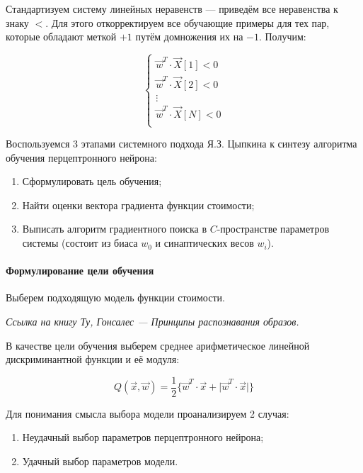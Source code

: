 \documentclass{article}
\numberwithin{equation}{subsection}
\begin{document}
Стандартизуем систему линейных неравенств --- приведём все неравенства к знаку $<$. 
Для этого откорректируем все обучающие примеры для тех пар, которые обладают меткой
$+1$ путём домножения их на $-1$. Получим:

\begin{equation}
    \begin{cases}
        \vec{w}^T \cdot \vec{X}[1] < 0 \\
        \vec{w}^T \cdot \vec{X}[2] < 0 \\
        \vdots \\
        \vec{w}^T \cdot \vec{X}[N] < 0 \\
    \end{cases}
    \label{eq:ineq_system}
\end{equation}

Воспользуемся 3 этапами системного подхода Я.З. Цыпкина к синтезу алгоритма обучения
перцептронного нейрона:
\begin{enumerate}
    \item Сформулировать цель обучения;
    \item Найти оценки вектора градиента функции стоимости;
    \item Выписать алгоритм градиентного поиска в $C$-пространстве параметров системы
    (состоит из биаса $w_0$ и синаптических весов $w_i$).
\end{enumerate}




\paragraph{Формулирование цели обучения}

Выберем подходящую модель функции стоимости.

\begin{myquote}
    \textit{Ссылка на книгу Ту, Гонсалес --- Принципы распознавания образов.}
\end{myquote}

В качестве цели обучения выберем среднее арифметическое линейной дискриминантной 
функции и её модуля:

\begin{equation}
    Q(\vec{x}, \vec{w}) = \dfrac{1}{2} \{ \vec{w}^T \cdot \vec{x} + \lvert \vec{w}^T \cdot \vec{x}  \rvert \}
\end{equation}

Для понимания смысла выбора модели проанализируем 2 случая:
\begin{enumerate}
    \item Неудачный выбор параметров перцептронного нейрона;
    \item Удачный выбор параметров модели.
\end{enumerate}
\end{document}
